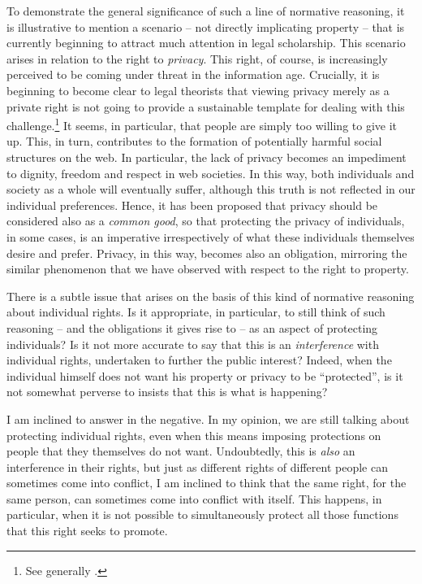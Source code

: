 To demonstrate the general significance of such a line of normative reasoning, it is illustrative to mention a scenario -- not directly implicating property -- that is currently beginning to attract much attention in legal scholarship. This scenario arises in relation to the right to {\it privacy}. This right, of course, is increasingly perceived to be coming under threat in the information age. Crucially, it is beginning to become clear to legal theorists that viewing privacy merely as a private right is not going to provide a sustainable template for dealing with this challenge.\footnote{See generally \cite{schafer14}.} It seems, in particular, that people are simply too willing to give it up. This, in turn, contributes to the formation of potentially harmful social structures on the web. In particular, the lack of privacy becomes an impediment to dignity, freedom and respect in web societies. In this way, both individuals and society as a whole will eventually suffer, although this truth is not reflected in our individual preferences. Hence, it has been proposed that privacy should be considered also as a {\it common good}, so that protecting the privacy of individuals, in some cases, is an imperative irrespectively of what these individuals themselves desire and prefer. Privacy, in this way, becomes also an obligation, mirroring the similar phenomenon that we have observed with respect to the right to property.

There is a subtle issue that arises on the basis of this kind of normative reasoning about individual rights. Is it appropriate, in particular, to still think of such reasoning -- and the obligations it gives rise to -- as an aspect of protecting individuals? Is it not more accurate to say that this is an {\it interference} with individual rights, undertaken to further the public interest? Indeed, when the individual himself does not want his property or privacy to be ``protected'', is it not somewhat perverse to insists that this is what is happening? 

I am inclined to answer in the negative. In my opinion, we are still talking about protecting individual rights, even when this means imposing protections on people that they themselves do not want. Undoubtedly, this is {\it also} an interference in their rights, but just as different rights of different people can sometimes come into conflict, I am inclined to think that the same right, for the same person, can sometimes come into conflict with itself. This happens, in particular, when it is not possible to simultaneously protect all those functions that this right seeks to promote. 

